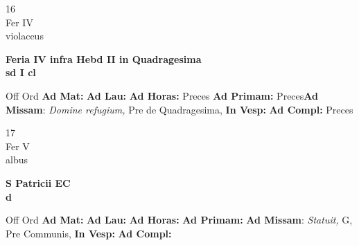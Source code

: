 \documentclass[10pt, openany]{book}
\begin{document}
        \begin{center}
            \begin{minipage}{3.5in}
                \vspace{2em}
                \begin{minipage}{0.5in}
                    {\Huge 16} \\
                    {\normalsize Fer IV} \\
                    {\normalsize violaceus}
                \end{minipage}
                \begin{minipage}{3.0in}
                    \textbf{ \large Feria IV infra Hebd II in Quadragesima \\
                    \textnormal{\normalsize sd I cl}} \\ 
                \end{minipage}
                \begin{justify}Off Ord
                    \textbf{Ad Mat: }
                    \textbf{Ad Lau: }
                    \textbf{Ad Horas: }Preces
                    \textbf{Ad Primam: }Preces\textbf{Ad Missam}: \textit{Domine refugium,} Pre de Quadragesima,  
                    \textbf{In Vesp: }
                    \textbf{Ad Compl: }Preces
                \end{justify}
            \end{minipage}
        \end{center}
    
        \begin{center}
            \begin{minipage}{3.5in}
                \vspace{2em}
                \begin{minipage}{0.5in}
                    {\Huge 17} \\
                    {\normalsize Fer V} \\
                    {\normalsize albus}
                \end{minipage}
                \begin{minipage}{3.0in}
                    \textbf{ \large S Patricii EC \\
                    \textnormal{\normalsize d}} \\ 
                \end{minipage}
                \begin{justify}Off Ord
                    \textbf{Ad Mat: }
                    \textbf{Ad Lau: }
                    \textbf{Ad Horas: }
                    \textbf{Ad Primam: }\textbf{Ad Missam}: \textit{Statuit,} G, Pre Communis,  
                    \textbf{In Vesp: }
                    \textbf{Ad Compl: }
                \end{justify}
            \end{minipage}
        \end{center}
    
\end{document}
